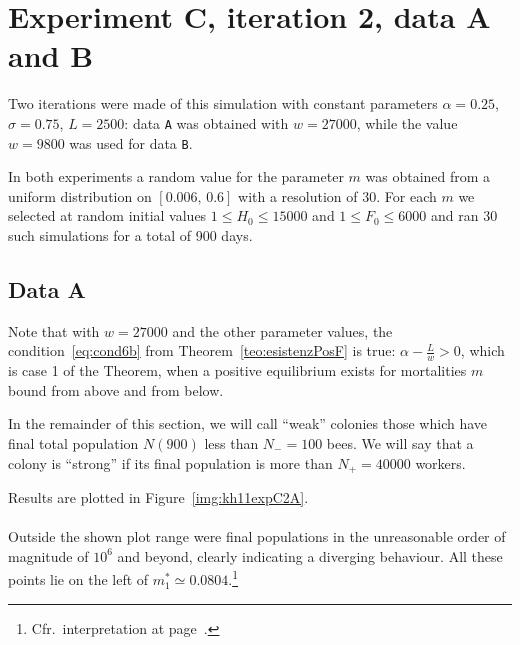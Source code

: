 \section{Experiment C, iteration 2, data A and B}
Two iterations were made of this simulation with constant parameters $\alpha = 0.25$, $\sigma=0.75$, $L=2500$:
data \texttt{A} was obtained with $w=27000$, while the value $w=9800$ was used for data \texttt{B}.

In both experiments a random value for the parameter $m$ was obtained from a uniform distribution on $[0.006, \, 0.6]$
with a resolution of 30. For each $m$ we selected at random initial values $1 \leq H_0 \leq 15000$ and $1 \leq F_0 \leq 6000$ and ran 30 such simulations for a total of 900 days.

\subsection{Data A}
\label{sec:kh11expC2A}
Note that with $w=27000$ and the other parameter values, the condition~\eqref{eq:cond6b} from Theorem~\ref{teo:esistenzPosF} is true: $\alpha - \frac{L}{w} > 0$, which is case 1 of the Theorem,
when a positive equilibrium exists for mortalities $m$ bound from above and from below.

In the remainder of this section, we will call ``weak'' colonies those which have final total
population $N(900)$ less than $N_- = 100$ bees. We will say that a colony is ``strong'' if
its final population is more than $N_+ = 40000$ workers.

Results are plotted in Figure~\ref{img:kh11expC2A}.

\paragraph{}
Outside the shown plot range were final populations in the unreasonable order of
magnitude of $10^6$ and beyond, clearly indicating a diverging behaviour.
All these points lie on the left of $m_1^* \simeq 0.0804$.\footnote{Cfr.~interpretation at page~\pageref{par:interpretationCond6b}.}

